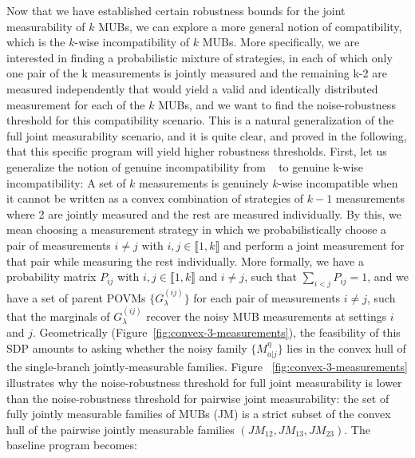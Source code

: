 \documentclass[oneside, a4paper, onecolumn, 11pt]{article}
\theoremstyle{definition}
\theoremstyle{plain}
\theoremstyle{remark}
\begin{document}
Now that we have established certain robustness bounds for the joint measurability of $k$ MUBs, 
we can explore a more general notion of compatibility, which is the $k$-wise incompatibility of $k$ MUBs.
More specifically, we are interested in finding a probabilistic mixture of strategies, in each of which only one pair of the k measurements is jointly measured and the remaining k-2 are measured independently that would yield a valid and identically distributed measurement for each of the $k$ MUBs, and we want to find the noise-robustness threshold for this compatibility scenario.
This is a natural generalization of the full joint measurability scenario, and it is quite clear, and proved in the following, that this specific program will yield higher robustness thresholds.
\newline 
First, let us generalize the notion of genuine incompatibility from ~\cite{Quintino2019} to genuine k-wise incompatibility:
\newline
A set of
$k$ measurements is genuinely $k$-wise incompatible
when it cannot be written as a convex combination of strategies of $k-1$ 
measurements where 2 are jointly measured and the rest are measured individually. By this, we mean choosing a measurement strategy in which we probabilistically choose a pair of measurements
$i \neq j$ with $i, j \in \llbracket 1, k \rrbracket $ and perform a joint measurement for that pair while measuring the rest individually.
\newline
More formally, we have a probability matrix $P_{ij}$ with $i, j \in \llbracket 1, k \rrbracket $ and $i \neq j$, such that $\sum_{i < j} P_{ij} = 1$, and we have a set of parent POVMs $\{G^{(ij)}_{\lambda}\}$ for each pair of measurements $i \neq j$, such that the marginals of $G^{(ij)}_{\lambda}$ recover the noisy MUB measurements at settings $i$ and $j$.
\newline Geometrically (Figure~\ref{fig:convex-3-measurements}), the feasibility of this SDP amounts to asking whether the noisy family $\{M^{\eta}_{a|j}\}$ lies in the convex hull of the single-branch jointly-measurable families.
Figure ~\ref{fig:convex-3-measurements} illustrates why the noise-robustness threshold for full joint measurability is lower than the noise-robustness threshold for pairwise joint measurability: the set of fully jointly measurable families of MUBs (JM) is a strict subset of the convex hull of the pairwise jointly measurable families $(JM_{12}, JM_{13}, JM_{23})$.
\newline
The baseline program becomes: 
\newline
\end{document}
